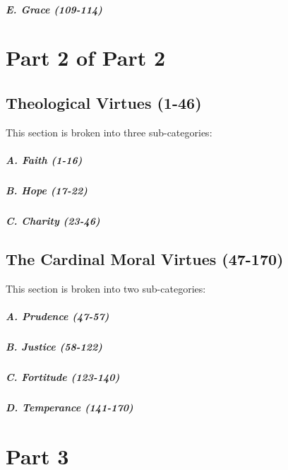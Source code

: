 \documentclass{ucetd}
\begin{document}
\paragraph{E. Grace (109-114)}
\clearpage

\chapter{Part 2 of Part 2}

\section{Theological Virtues (1-46)}
This section is broken into three sub-categories:
\paragraph{A. Faith (1-16)}

\paragraph{B. Hope (17-22)}
\paragraph{C. Charity (23-46)}
\clearpage

\section{The Cardinal Moral Virtues (47-170)}
This section is broken into two sub-categories:
\paragraph{A. Prudence (47-57)}

\paragraph{B. Justice (58-122)}

\paragraph{C. Fortitude (123-140)}

\paragraph{D. Temperance (141-170)}
\clearpage


\chapter{Part 3}
\end{document}
